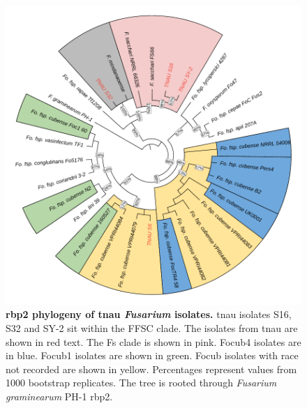 \newpage
\begin{figure}[htp!]
    \centering
    \includegraphics[width=14cm]{Appendices/RPNii-Phylogeny.pdf}
    \caption[\Acl{rbp2} phylogeny of \acl{tnau} \textit{Fusarium} isolates.]{\textbf{\Acl{rbp2} phylogeny of \acl{tnau} \textit{Fusarium} isolates.} \Ac{tnau} isolates S16, S32 and SY-2 sit within the \acf{FFSC} clade. The isolates from \ac{tnau} are shown in red text. The \acf{Fs} clade is shown in pink. \Acf{Focub4} isolates are in blue. \Acf{Focub1} isolates are shown in green. \acf{Focub} isolates with race not recorded are shown in yellow. Percentages represent values from 1000 bootstrap replicates. The tree is rooted through \textit{Fusarium graminearum} PH-1 \ac{rbp2}.}
    \label{fig:rbp2Phylo}
\end{figure}

\newpage
